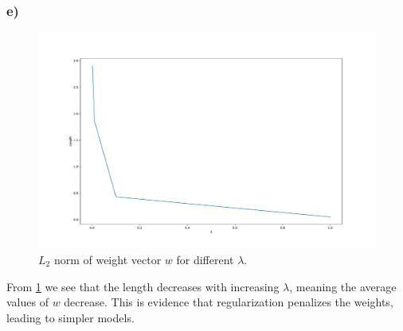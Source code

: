 \subsubsection*{e)}

\begin{figure}[h!]
  \centering
  \includegraphics[clip, trim=0cm 0cm 0cm 0cm, width=\textwidth]{figures/Task4e.pdf}
  \caption{$L_2$ norm of weight vector $w$ for different $\lambda$.}
  \label{fig:task4:norm}
\end{figure}

From \cref{fig:task4:norm} we see that the length decreases with increasing $\lambda$, meaning the average values of $w$ decrease. This is evidence that regularization penalizes the weights, leading to simpler models.
